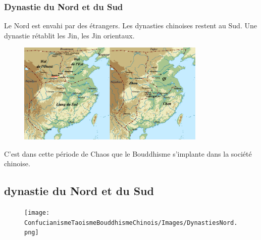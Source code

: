  
\subsubsection{Dynastie du Nord et du Sud}
Le Nord est envahi par des étrangers. Les dynasties chinoises restent au Sud. Une dynastie rétablit les Jin, les Jin orientaux. 

\begin{figure}[!h]
    \centering
    \includegraphics[width=0.8\textwidth]{ConfucianismeTaoismeBouddhismeChinois/Images/Dynastie3.png}
 
    \label{fig:enter-label}
\end{figure}

C'est dans cette période de Chaos que le Bouddhisme s'implante dans la société chinoise.

\subsection{dynastie du Nord et du Sud}
\begin{figure}[!h]
    \centering
    \texttt{[image: ConfucianismeTaoismeBouddhismeChinois/Images/DynastiesNord.png]}
 
    \label{fig:enter-label}
\end{figure} 



